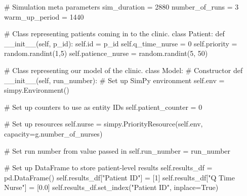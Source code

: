 \documentclass[
  letterpaper,
  DIV=11,
  numbers=noendperiod]{scrreprt}
\newenvironment{Shaded}{\begin{snugshade}}{\end{snugshade}}
\newcommand{\BuiltInTok}[1]{\textcolor[rgb]{0.00,0.23,0.31}{#1}}
\newcommand{\CommentTok}[1]{\textcolor[rgb]{0.37,0.37,0.37}{#1}}
\newcommand{\DecValTok}[1]{\textcolor[rgb]{0.68,0.00,0.00}{#1}}
\newcommand{\FloatTok}[1]{\textcolor[rgb]{0.68,0.00,0.00}{#1}}
\newcommand{\FunctionTok}[1]{\textcolor[rgb]{0.28,0.35,0.67}{#1}}
\newcommand{\KeywordTok}[1]{\textcolor[rgb]{0.00,0.23,0.31}{#1}}
\newcommand{\NormalTok}[1]{\textcolor[rgb]{0.00,0.23,0.31}{#1}}
\newcommand{\OperatorTok}[1]{\textcolor[rgb]{0.37,0.37,0.37}{#1}}
\newcommand{\StringTok}[1]{\textcolor[rgb]{0.13,0.47,0.30}{#1}}
\newcommand{\VariableTok}[1]{\textcolor[rgb]{0.07,0.07,0.07}{#1}}
\begin{document}
\begin{tcolorbox}
\begin{Shaded}
\begin{Highlighting}[]
    \CommentTok{\# Simulation meta parameters}
\NormalTok{    sim\_duration }\OperatorTok{=} \DecValTok{2880}
\NormalTok{    number\_of\_runs }\OperatorTok{=} \DecValTok{3}
\NormalTok{    warm\_up\_period }\OperatorTok{=} \DecValTok{1440}

\CommentTok{\# Class representing patients coming in to the clinic.}
\KeywordTok{class}\NormalTok{ Patient:}
    \KeywordTok{def} \FunctionTok{\_\_init\_\_}\NormalTok{(}\VariableTok{self}\NormalTok{, p\_id):}
        \VariableTok{self}\NormalTok{.}\BuiltInTok{id} \OperatorTok{=}\NormalTok{ p\_id}
        \VariableTok{self}\NormalTok{.q\_time\_nurse }\OperatorTok{=} \DecValTok{0}
        \VariableTok{self}\NormalTok{.priority }\OperatorTok{=}\NormalTok{ random.randint(}\DecValTok{1}\NormalTok{,}\DecValTok{5}\NormalTok{)}
        \VariableTok{self}\NormalTok{.patience\_nurse }\OperatorTok{=}\NormalTok{ random.randint(}\DecValTok{5}\NormalTok{, }\DecValTok{50}\NormalTok{)}

\CommentTok{\# Class representing our model of the clinic.}
\KeywordTok{class}\NormalTok{ Model:}
    \CommentTok{\# Constructor}
    \KeywordTok{def} \FunctionTok{\_\_init\_\_}\NormalTok{(}\VariableTok{self}\NormalTok{, run\_number):}
        \CommentTok{\# Set up SimPy environment}
        \VariableTok{self}\NormalTok{.env }\OperatorTok{=}\NormalTok{ simpy.Environment()}

        \CommentTok{\# Set up counters to use as entity IDs}
        \VariableTok{self}\NormalTok{.patient\_counter }\OperatorTok{=} \DecValTok{0}

        \CommentTok{\# Set up resources}
        \VariableTok{self}\NormalTok{.nurse }\OperatorTok{=}\NormalTok{ simpy.PriorityResource(}\VariableTok{self}\NormalTok{.env,}
\NormalTok{                                            capacity}\OperatorTok{=}\NormalTok{g.number\_of\_nurses)}

        \CommentTok{\# Set run number from value passed in}
        \VariableTok{self}\NormalTok{.run\_number }\OperatorTok{=}\NormalTok{ run\_number}

        \CommentTok{\# Set up DataFrame to store patient{-}level results}
        \VariableTok{self}\NormalTok{.results\_df }\OperatorTok{=}\NormalTok{ pd.DataFrame()}
        \VariableTok{self}\NormalTok{.results\_df[}\StringTok{"Patient ID"}\NormalTok{] }\OperatorTok{=}\NormalTok{ [}\DecValTok{1}\NormalTok{]}
        \VariableTok{self}\NormalTok{.results\_df[}\StringTok{"Q Time Nurse"}\NormalTok{] }\OperatorTok{=}\NormalTok{ [}\FloatTok{0.0}\NormalTok{]}
        \VariableTok{self}\NormalTok{.results\_df.set\_index(}\StringTok{"Patient ID"}\NormalTok{, inplace}\OperatorTok{=}\VariableTok{True}\NormalTok{)}


\end{Highlighting}
\end{Shaded}
\end{tcolorbox}
\end{document}
